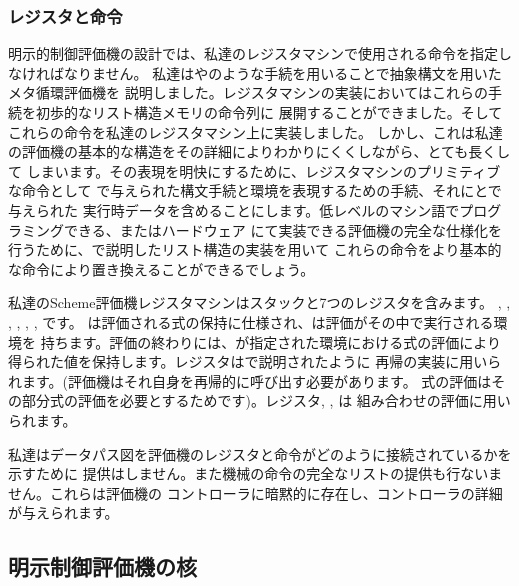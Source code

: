 \subsubsection*{レジスタと命令}

明示的制御評価機の設計では、私達のレジスタマシンで使用される命令を指定しなければなりません。
私達はやのような手続を用いることで抽象構文を用いたメタ循環評価機を
説明しました。レジスタマシンの実装においてはこれらの手続を初歩的なリスト構造メモリの命令列に
展開することができました。そしてこれらの命令を私達のレジスタマシン上に実装しました。
しかし、これは私達の評価機の基本的な構造をその詳細によりわかりにくくしながら、とても長くして
しまいます。その表現を明快にするために、レジスタマシンのプリミティブな命令として
で与えられた構文手続と環境を表現するための手続、それにとで与えられた
実行時データを含めることにします。低レベルのマシン語でプログラミングできる、またはハードウェア
にて実装できる評価機の完全な仕様化を行うために、で説明したリスト構造の実装を用いて
これらの命令をより基本的な命令により置き換えることができるでしょう。

私達のScheme評価機レジスタマシンはスタックと7つのレジスタを含みます。
, , , , , , です。
は評価される式の保持に仕様され、は評価がその中で実行される環境を
持ちます。評価の終わりには、が指定された環境における式の評価により
得られた値を保持します。レジスタはで説明されたように
再帰の実装に用いられます。(評価機はそれ自身を再帰的に呼び出す必要があります。
式の評価はその部分式の評価を必要とするためです)。レジスタ, , は
組み合わせの評価に用いられます。

私達はデータパス図を評価機のレジスタと命令がどのように接続されているかを示すために
提供はしません。また機械の命令の完全なリストの提供も行ないません。これらは評価機の
コントローラに暗黙的に存在し、コントローラの詳細が与えられます。



\subsection{明示制御評価機の核}
\label{Section 5.4.1}

